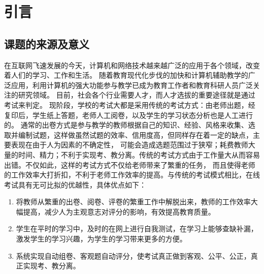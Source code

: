 \chapter{引言}

\section{课题的来源及意义}
在互联网飞速发展的今天，计算机和网络技术越来越广泛的应用于各个领域，改变着人们的学习、工作和生活。
随着教育现代化步伐的加快和计算机辅助教学的广泛应用，利用计算机的强大功能参与教学已成为教育工作者和教育科研人员广泛关注的研究领域。
目前，社会各个行业需要人才，而人才选拔的重要途径就是通过考试来判定。
现阶段，学校的考试大都是采用传统的考试方式：由老师出题，经复印后，学生纸上答题，老师人工阅卷，以及学生的学习状态分析也是人工进行的。
通常的出卷方式是参与教学的教师根据自己的知识、经验、风格来收集、选取并编制试题，这样做虽然试题的效率、信用度高，但同样存在着一定的缺点，主要表现在由于人为因素的不确定性，
可能会造成选题范围过于狭窄；耗费教师大量的时间、精力；不利于实现考、教分离。传统的考试方式由于工作量大从而容易出错。不仅如此，这样的考试方式不仅给老师带来了繁重的任务，
而且使得老师的工作效率大打折扣，不利于老师工作效率的提高。与传统的考试模式相比，在线考试具有无可比拟的优越性，具体优点如下：
\begin{enumerate}
	\item 将教师从繁重的出卷、阅卷、评卷的繁重工作中解脱出来，教师的工作效率大幅提高，减少人为主观意志对评分的影响，有效提高教育质量。
	\item 学生在平时的学习中，及时的在网上进行自我测试，在学习上能够查缺补漏，激发学生的学习兴趣，为学生的学习带来更多的方便。
	\item 系统实现自动组卷、客观题自动评分，使考试真正做到客观、公平、公正，真正实现考、教分离。
\end{enumerate}
